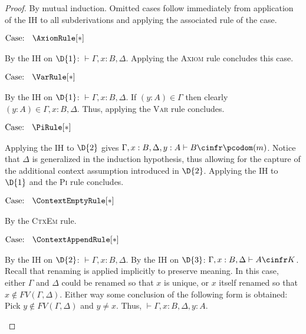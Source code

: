 \begin{proof}
    By mutual induction.
    Omitted cases follow immediately from application of the IH to all subderivations and applying the associated rule of the case.

    $\text{Case: }\begin{array}{c} \AxiomRule[*] \end{array}$
    \begin{proofcase}
        By the IH on $\D{1}$: $\vdash \Gamma, x : B, \Delta$.
        Applying the \textsc{Axiom} rule concludes this case.
    \end{proofcase}

    $\text{Case: }\begin{array}{c} \VarRule[*] \end{array}$
    \begin{proofcase}        
        By the IH on $\D{1}$: $\vdash \Gamma, x : B, \Delta$.
        If $(y : A) \in \Gamma$ then clearly $(y : A) \in \Gamma, x : B, \Delta$.
        Thus, applying the \textsc{Var} rule concludes.
    \end{proofcase}

    $\text{Case: }\begin{array}{c} \PiRule[*] \end{array}$
    \begin{proofcase}
        Applying the IH to $\D{2}$ gives $\Gamma, x : B, \Delta, y : A \vdash B \cinfr \pcodom(m)$.
        Notice that $\Delta$ is generalized in the induction hypothesis, thus allowing for the capture of the additional context assumption introduced in $\D{2}$.
        Applying the IH to $\D{1}$ and the \textsc{Pi} rule concludes.
    \end{proofcase}

    $\text{Case: }\begin{array}{c} \ContextEmptyRule[*] \end{array}$
    \begin{proofcase}
        By the \textsc{CtxEm} rule.
    \end{proofcase}

    $\text{Case: }\begin{array}{c} \ContextAppendRule[*] \end{array}$
    \begin{proofcase}
        By the IH on $\D{2}$: $\vdash \Gamma, x : B, \Delta$.
        By the IH on $\D{3}$: $\Gamma, x : B, \Delta \vdash A \cinfr K$.
        Recall that renaming is applied implicitly to preserve meaning.
        In this case, either $\Gamma$ and $\Delta$ could be renamed so that $x$ is unique, or $x$ itself renamed so that $x \notin FV(\Gamma, \Delta)$.
        Either way some conclusion of the following form is obtained: Pick $y \notin FV(\Gamma, \Delta)$ and $y \neq x$.
        Thus, $\vdash \Gamma, x : B, \Delta, y : A$.
    \end{proofcase}
\end{proof}

